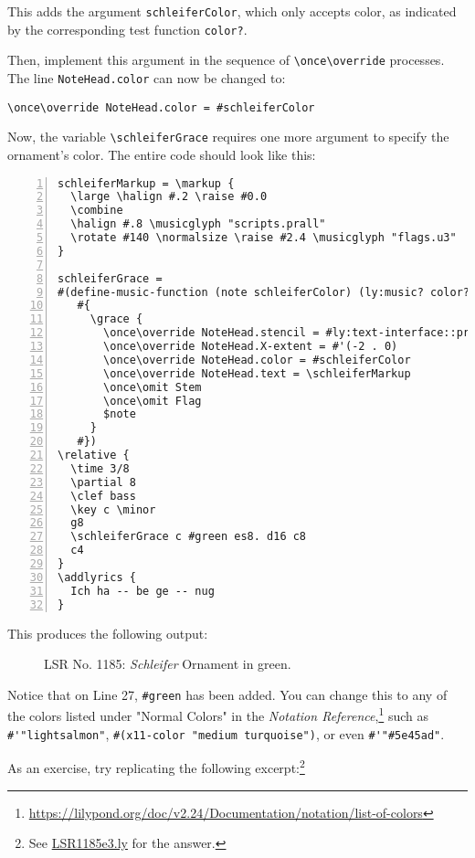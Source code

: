 This adds the argument \verb|schleiferColor|, which only accepts color, as indicated by the corresponding test function \verb|color?|.

Then, implement this argument in the sequence of \verb+\once\override+ processes. The line \verb+NoteHead.color+ can now be changed to:

\begin{verbatim}
\once\override NoteHead.color = #schleiferColor
\end{verbatim}

Now, the variable \verb+\schleiferGrace+ requires one more argument to specify the ornament's color. The entire code should look like this:

\begin{Verbatim}[numbers=left,xleftmargin=5mm]
schleiferMarkup = \markup {
  \large \halign #.2 \raise #0.0
  \combine
  \halign #.8 \musicglyph "scripts.prall"
  \rotate #140 \normalsize \raise #2.4 \musicglyph "flags.u3"
}

schleiferGrace =
#(define-music-function (note schleiferColor) (ly:music? color?)
   #{
     \grace {
       \once\override NoteHead.stencil = #ly:text-interface::print
       \once\override NoteHead.X-extent = #'(-2 . 0)
       \once\override NoteHead.color = #schleiferColor
       \once\override NoteHead.text = \schleiferMarkup
       \once\omit Stem
       \once\omit Flag
       $note
     }
   #})
\relative {
  \time 3/8
  \partial 8
  \clef bass
  \key c \minor
  g8
  \schleiferGrace c #green es8. d16 c8
  c4
}
\addlyrics {
  Ich ha -- be ge -- nug
}
\end{Verbatim}

This produces the following output:

	\begin{figure}[!htb]
	\centering
{}
	\caption{\label{fig:figure3} LSR No. 1185: \textit{Schleifer} Ornament in green.}
	\end{figure}
\vfill \break
\clearpage
	
Notice that on Line 27, \verb+#green+ has been added. You can change this to any of the colors listed under "Normal Colors" in the \textit{Notation Reference},\footnote{\url{https://lilypond.org/doc/v2.24/Documentation/notation/list-of-colors}} such as \verb+#'"lightsalmon"+, \verb+#(x11-color "medium turquoise")+, or even \verb+#'"#5e45ad"+.

As an exercise, try replicating the following excerpt:\footnote{See \href{https://github.com/yoshiakionishi/lilypond-snippets/blob/main/DOCUMENT/LSR1185e3.ly}{LSR1185e3.ly} for the answer.}

